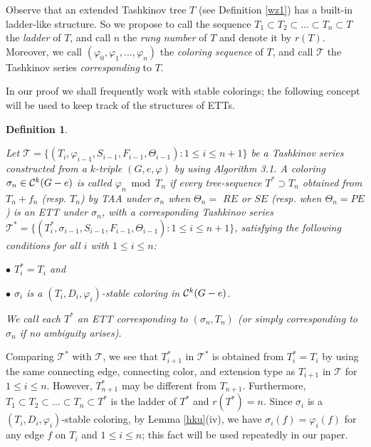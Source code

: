 \documentclass[11pt]{article}
\newtheorem{definition}[theorem]{Definition}
\newcommand{\TT}{\mathcal {T}}
\newcommand{\phiv}{\varphi}
\begin{document}
Observe that an extended Tashkinov tree $T$ (see Definition \ref{wz1}) has a built-in ladder-like structure. So we propose to call the sequence 
$T_1\subset T_2 \subset \ldots \subset T_n \subset T$ the {\it ladder}\label{ladder} of $T$, and call $n$ the {\it rung number}\label{rung} of $T$ and 
denote it by $r(T)$. Moreover, we call $(\phiv_0, \phiv_1, \dots, \phiv_n)$ the {\it coloring sequence}\label{coloringsequence} of $T$, and call $\TT$ the 
Tashkinov series {\em corresponding} to $T$.

In our proof we shall frequently work with stable colorings; the following concept will be used to keep track of 
the structures of ETTs.   

\begin{definition} \label{wz2}
{\rm  Let $\TT=\{(T_i, \phiv_{i-1}, S_{i-1}, F_{i-1}, \Theta_{i-1}): 1\le i \le n+1\}$ be a Tashkinov series 
constructed from a $k$-triple $(G,e, \varphi)$ by using Algorithm 3.1. A coloring $\sigma_n\in  {\cal C}^k(G-e)$
is called $\varphi_n \bmod T_n$\label{modcoloring} if every tree-sequence $T^*\supset T_n$ obtained from $T_n+f_n$ 
(resp. $T_n$) by TAA under $\sigma_n$ when $\Theta_n=$ $RE$ or $SE$ (resp. when $\Theta_n=PE$) is an ETT under 
$\sigma_n$, with a corresponding Tashkinov series $\TT^*=\{(T_i^*, \sigma_{i-1}, S_{i-1}, F_{i-1}, \Theta_{i-1}): 
1\le i \le n+1\}$, satisfying the following conditions for all $i$ with $1\le i \le n$:

\vskip 1mm

$\bullet$ $T_i^*=T_i$ and

$\bullet$ $\sigma_i$ is a $(T_i, D_i, \varphi_i)$-stable coloring in ${\cal C}^k(G-e)$. 
\vskip 1mm

\noindent We call each $T^*$ an ETT {\em corresponding} to $(\sigma_n, T_n)$ (or simply {\em corresponding}\label{correspondingett} to 
$\sigma_n$ if no ambiguity arises).}
\end{definition}

 Comparing $\TT^*$ with $\TT$, we see that $T_{i+1}^*$ in $\TT^*$ is obtained from $T^*_i=T_i$ by 
using the same connecting edge, connecting color, and extension type as $T_{i+1}$ in $\TT$ for $1\le i \le n$. However, $T^*_{n+1}$ may be different from $T_{n+1}$.
Furthermore, $T_1\subset T_2 \subset \ldots \subset T_n \subset T^*$ is the ladder of $T^*$ and $r(T^*)=n$.  
Since $\sigma_i$ is a $(T_i, D_i, \varphi_i)$-stable coloring, by Lemma \ref{hku}(iv), we have $\sigma_i(f)=\varphi_i(f)$ 
for any edge $f$ on $T_i$ and $1\le i \le n$; this fact will be used repeatedly in our paper. 
\end{document}
